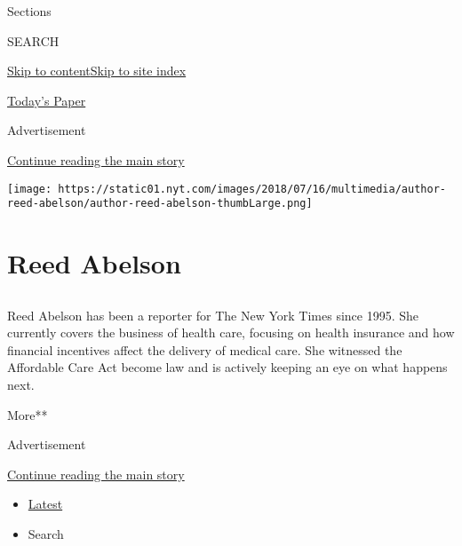 Sections

SEARCH

\protect\hyperlink{site-content}{Skip to
content}\protect\hyperlink{site-index}{Skip to site index}

\href{https://myaccount.nytimes.com/auth/login?response_type=cookie\&client_id=vi}{}

\href{https://www.nytimes.com/section/todayspaper}{Today's Paper}

Advertisement

\protect\hyperlink{after-top}{Continue reading the main story}

\texttt{[image: https://static01.nyt.com/images/2018/07/16/multimedia/author-reed-abelson/author-reed-abelson-thumbLarge.png]}

\hypertarget{reed-abelson}{%
\section{Reed Abelson}\label{reed-abelson}}

\subsection{}

Reed Abelson has been a reporter for The New York Times since 1995. She
currently covers the business of health care, focusing on health
insurance and how financial incentives affect the delivery of medical
care. She witnessed the Affordable Care Act become law and is actively
keeping an eye on what happens next.

More**

Advertisement

\protect\hyperlink{after-mid1}{Continue reading the main story}

\begin{itemize}
\tightlist
\item
  \protect\hyperlink{stream-panel}{Latest}
\item
  Search
\end{itemize}

